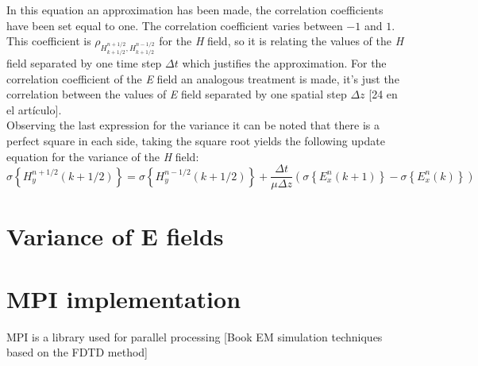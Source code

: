 \documentclass[12pt, oneside]{book}
\begin{document}
In this equation an approximation has been made, the correlation coefficients have been set equal to one. The correlation coefficient varies between $-1$ and $1$. This coefficient is $\rho_{H_{k+1/2}^{n+1/2},H_{k+1/2}^{n-1/2}}$ for the \textit{H} field, so it is relating the values of the \textit{H} field separated by one time step $\Delta t$ which justifies the approximation. For the correlation coefficient of the \textit{E} field an analogous treatment is made, it's just the correlation between the values of \textit{E} field separated by one spatial step $\Delta z$ [24 en el artículo]. \\
\indent Observing the last expression for the variance it can be noted that there is a perfect square in each side, taking the square root yields the following update equation for the variance of the \textit{H} field:
\begin{equation}
\sigma\left\lbrace H_y^{n+1/2}(k+1/2) \right\rbrace = \sigma\left\lbrace H_y^{n-1/2}(k+1/2)\right\rbrace + \frac{\Delta t}{\mu \Delta z}\left(\sigma \left\lbrace E_x^n(k+1)\right\rbrace -\sigma\left\lbrace E_x^n(k)\right\rbrace \right)
\end{equation}
\section{Variance of E fields}

\section{MPI implementation}
MPI is a library used for parallel processing [Book EM simulation techniques based on the FDTD method]










\end{document}
